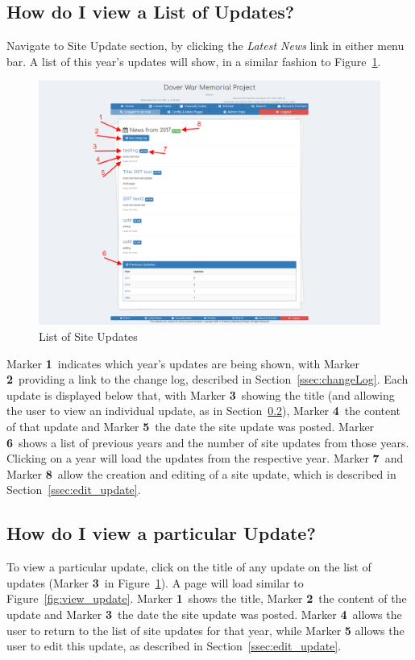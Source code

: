 \documentclass[12pt]{article}
\newcommand{\marker}[1]{Marker \color{red}\textbf{#1}\color{black}}
\begin{document}
\subsection{How do I view a List of Updates?}\label{ssec:view_updates}

Navigate to Site Update section, by clicking the \textit{Latest News} link in either menu bar. A list of this year's updates will show, in a similar fashion to Figure~\ref{fig:view_updates}.

\begin{figure}[h]
  \centering
 \includegraphics[width=.9\textwidth]{pics/view_updates.png}
	\caption{List of Site Updates}\label{fig:view_updates}
\end{figure}

\marker{1}\ indicates which year's updates are being shown, with \marker{2}\ providing a link to the change log, described in Section~\ref{ssec:changeLog}. Each update is displayed below that, with \marker{3}\ showing the title (and allowing the user to view an individual update, as in Section~\ref{ssec:view_update}), \marker{4}\ the content of that update and \marker{5}\ the date the site update was posted. \marker{6}\ shows a list of previous years and the number of site updates from those years. Clicking on a year will load the updates from the respective year. \marker{7}\ and \marker{8}\ allow the creation and editing of a site update, which is described in Section~\ref{ssec:edit_update}.

\newpage
\FloatBarrier
\subsection{How do I view a particular Update?}\label{ssec:view_update}
To view a particular update, click on the title of any update on the list of updates (\marker{3}\ in Figure~\ref{fig:view_updates}). A page will load similar to Figure~\ref{fig:view_update}. \marker{1}\ shows the title, \marker{2}\ the content of the update and \marker{3}\ the date the site update was posted. \marker{4}\ allows the user to return to the list of site updates for that year, while \marker{5} allows the user to edit this update, as described in Section~\ref{ssec:edit_update}.
\end{document}
